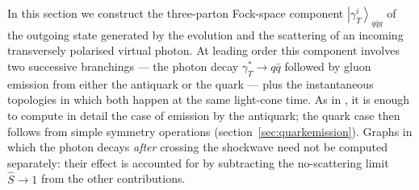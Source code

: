 \documentclass[11pt,a4paper]{article}
\newcommand{\ket}[1]{\left|#1\right\rangle}
\numberwithin{equation}{section}
\begin{document}
In this section we construct the three-parton Fock-space component
$\ket{\gamma^i_T}_{q\bar qg}$ of the outgoing state generated by the evolution and the
scattering of an incoming transversely polarised virtual photon. At leading order this
component involves two successive branchings --- the photon decay $\gamma^*_T\to q\bar q$
followed by gluon emission from either the antiquark or the quark --- plus the instantaneous
topologies in which both happen at the same light-cone time. As in \cite{Iancu:2022gpw}, it is
enough to compute in detail the case of emission by the antiquark; the quark case then follows
from simple symmetry operations (section~\ref{sec:quarkemission}). Graphs in which the photon
decays \emph{after} crossing the shockwave need not be computed separately: their effect is
accounted for by subtracting the no-scattering limit $\hat S\to 1$ from the other
contributions.
\end{document}
